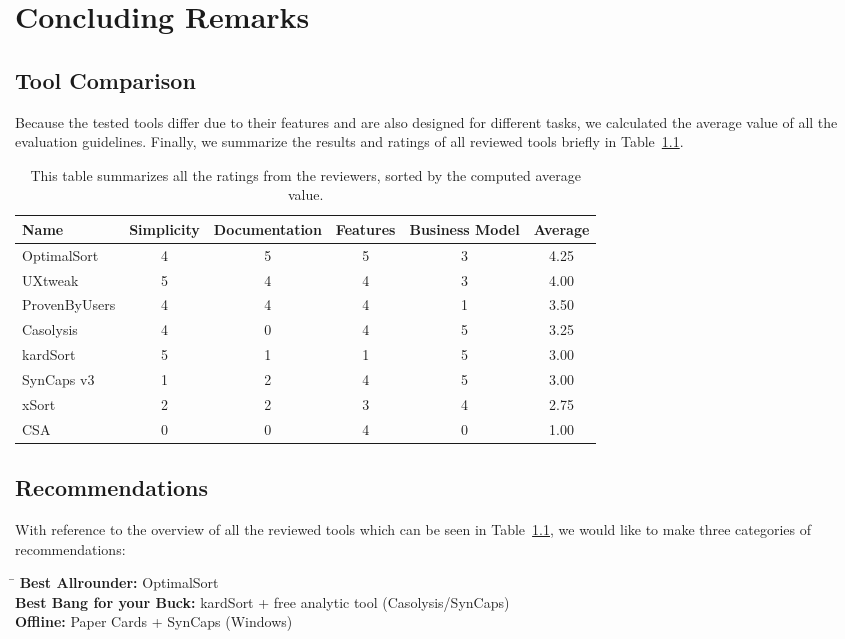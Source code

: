 \chapter{Concluding Remarks}

\label{chap:Concl}

\section{Tool Comparison}

Because the tested tools differ due to their features and are also designed for different tasks, 
we calculated the average value of all the evaluation guidelines. 
Finally, we summarize the results and ratings of all reviewed tools briefly in Table~\ref{tab:tool-comparison}.

\begin{table}[tp]
\centering
\begin{tabularx}
{\linewidth}{|X|c|c|c|c|c|}
\hline \textbf{Name} & \textbf{Simplicity} & \textbf{Documentation} & \textbf{Features} & \textbf{Business Model} & \textbf{Average}\\ 
\hline OptimalSort & 4 & 5 & 5 & 3 & 4.25 \\ 
\hline UXtweak & 5 & 4 & 4 & 3 & 4.00 \\ 
\hline ProvenByUsers & 4 & 4 & 4 & 1 & 3.50 \\ 
\hline Casolysis & 4 & 0 & 4 & 5 & 3.25 \\ 
\hline kardSort & 5 & 1 & 1 & 5 & 3.00 \\ 
\hline SynCaps v3 & 1 & 2 & 4 & 5 & 3.00 \\ 
\hline xSort & 2 & 2 & 3 & 4 & 2.75 \\ 
\hline CSA & 0 & 0 & 4 & 0 & 1.00 \\ 
\hline
\end{tabularx} 
\caption[Tool Comparison] 
{ 
This table summarizes all the ratings from the reviewers, sorted by the computed average value.
}
\label{tab:tool-comparison}
\end{table}

\section{Recommendations}
With reference to the overview of all the reviewed tools which can be seen in Table~\ref{tab:tool-comparison}, we would like to make three categories of recommendations:


\begin{tabbing}
\hspace*{5cm}\= \kill
\textbf{Best Allrounder:} \> OptimalSort \\
\textbf{Best Bang for your Buck:} \> kardSort + free analytic tool (Casolysis/SynCaps) \\
\textbf{Offline:} \> Paper Cards + SynCaps (Windows)
\end{tabbing}
